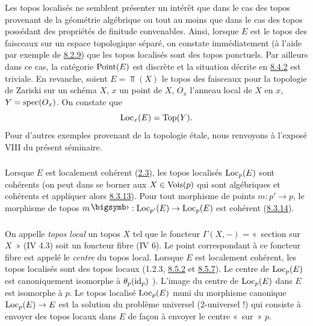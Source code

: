 \documentclass[10pt]{../fichiers-configuration-latex/smfart}
\begin{document}
Les topos localisés ne semblent présenter un intérêt que dans le cas
des topos provenant de la géométrie algébrique ou tout au moins que
dans le cas des topos possédant des propriétés de finitude
convenables. Ainsi, lorsque $E$ est le topos des faisceaux sur un
espace topologique séparé, on constate immédiatement (à l'aide par
exemple de \hyperref[VI.thm8.2.9]{8.2.9}) que les topos localisés sont des topos
ponctuels. Par ailleurs dans ce cas, la catégorie $\operatorname{Point}(E)$ est
discrète et la situation décrite en \hyperref[VI.subsubsec8.4.2]{8.4.2} est
triviale. En revanche, soient $E = \Top(X)$ le topos des faisceaux
pour la topologie de Zariski sur un schéma $X$, $x$ un point de $X$,
$O_x$ l'anneau local de $X$ en $x$, $Y = \operatorname{spec}(O_x)$. On constate
que
$$
\operatorname{Loc}_x(E) = \operatorname{Top}(Y){}.
$$
Pour d'autres exemples provenant de la topologie étale, nous renvoyons
à l'exposé VIII du présent séminaire.

\subsubsection{}

Lorsque $E$ est localement cohérent (\hyperref[VI.def2.3]{2.3}), les topos localisés
$\operatorname{Loc}_p(E)$ sont cohérents (on peut dans  se borner aux $X \in
\operatorname{Vois}(p)$ qui sont algébriques et cohérents et appliquer alors
\hyperref[VI.thm8.3.13]{8.3.13}). Pour tout morphisme de points $m : p'\to p$, le morphisme de
topos $m\bigdot : \Loc_{p'}(E) \to \Loc_p(E)$ est cohérent (\hyperref[VI.cor8.3.14]{8.3.14}).

\subsubsection{}

On appelle \emph{topos local} un topos $X$ tel que le foncteur
$\Gamma(X, -)$ = « section sur $X$ » (IV 4.3) soit un foncteur
fibre (IV 6). Le point correspondant à ce foncteur fibre est appelé le
\emph{centre} du topos local. Lorsque $E$ est localement cohérent, les
topos localisés sont des topos locaux (1.2.3, \hyperref[VI.prop8.5.2]{8.5.2} et \hyperref[VI.cor8.5.7]{8.5.7}). Le
centre de $\operatorname{Loc}_p(E)$ est canoniquement isomorphe à $\theta_p(\operatorname{id}_p)$
). L'image du centre de $\operatorname{Loc}_p(E)$ dans $E$ est isomorphe à
$p$. Le topos localisé $\operatorname{Loc}_p(E)$ muni du morphisme canonique\pageoriginale
$\Loc_p(E) \to E$ est la solution du problème universel (2-universel !)
qui consiste à envoyer des topos locaux dans $E$ de façon à
envoyer le centre « sur » $p$.
\end{document}
